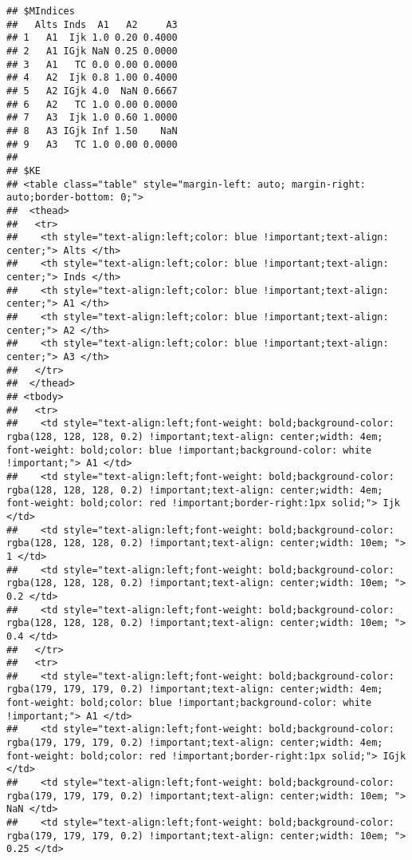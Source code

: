 \documentclass[
]{article}
\begin{document}
\begin{verbatim}
## $MIndices
##   Alts Inds  A1   A2     A3
## 1   A1  Ijk 1.0 0.20 0.4000
## 2   A1 IGjk NaN 0.25 0.0000
## 3   A1   TC 0.0 0.00 0.0000
## 4   A2  Ijk 0.8 1.00 0.4000
## 5   A2 IGjk 4.0  NaN 0.6667
## 6   A2   TC 1.0 0.00 0.0000
## 7   A3  Ijk 1.0 0.60 1.0000
## 8   A3 IGjk Inf 1.50    NaN
## 9   A3   TC 1.0 0.00 0.0000
## 
## $KE
## <table class="table" style="margin-left: auto; margin-right: auto;border-bottom: 0;">
##  <thead>
##   <tr>
##    <th style="text-align:left;color: blue !important;text-align: center;"> Alts </th>
##    <th style="text-align:left;color: blue !important;text-align: center;"> Inds </th>
##    <th style="text-align:left;color: blue !important;text-align: center;"> A1 </th>
##    <th style="text-align:left;color: blue !important;text-align: center;"> A2 </th>
##    <th style="text-align:left;color: blue !important;text-align: center;"> A3 </th>
##   </tr>
##  </thead>
## <tbody>
##   <tr>
##    <td style="text-align:left;font-weight: bold;background-color: rgba(128, 128, 128, 0.2) !important;text-align: center;width: 4em; font-weight: bold;color: blue !important;background-color: white !important;"> A1 </td>
##    <td style="text-align:left;font-weight: bold;background-color: rgba(128, 128, 128, 0.2) !important;text-align: center;width: 4em; font-weight: bold;color: red !important;border-right:1px solid;"> Ijk </td>
##    <td style="text-align:left;font-weight: bold;background-color: rgba(128, 128, 128, 0.2) !important;text-align: center;width: 10em; "> 1 </td>
##    <td style="text-align:left;font-weight: bold;background-color: rgba(128, 128, 128, 0.2) !important;text-align: center;width: 10em; "> 0.2 </td>
##    <td style="text-align:left;font-weight: bold;background-color: rgba(128, 128, 128, 0.2) !important;text-align: center;width: 10em; "> 0.4 </td>
##   </tr>
##   <tr>
##    <td style="text-align:left;font-weight: bold;background-color: rgba(179, 179, 179, 0.2) !important;text-align: center;width: 4em; font-weight: bold;color: blue !important;background-color: white !important;"> A1 </td>
##    <td style="text-align:left;font-weight: bold;background-color: rgba(179, 179, 179, 0.2) !important;text-align: center;width: 4em; font-weight: bold;color: red !important;border-right:1px solid;"> IGjk </td>
##    <td style="text-align:left;font-weight: bold;background-color: rgba(179, 179, 179, 0.2) !important;text-align: center;width: 10em; "> NaN </td>
##    <td style="text-align:left;font-weight: bold;background-color: rgba(179, 179, 179, 0.2) !important;text-align: center;width: 10em; "> 0.25 </td>

\end{verbatim}
\end{document}
